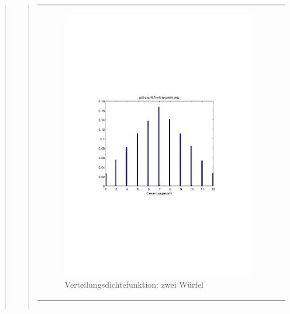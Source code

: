 \begin{quote}
\begin{quote}
\begin{center}
\begin{tabular}{ll}
            \begin{minipage}{0.6\textwidth}
                \begin{figure}[H]
                    \label{fig:pico_funktion0alpha}
                    \includegraphics[scale=0.7, trim = 20mm 80mm 20mm 90mm, clip]{Bilder/A1_2}
                    \caption{Verteilungsdichtefunktion: zwei Würfel}
                \end{figure}
        
            \end{minipage}
        
        \end{tabular}
        \end{center}

        \begin{center}
        \begin{tabular}{ll}
        

\end{tabular}
\end{center}
\end{quote}
\end{quote}
